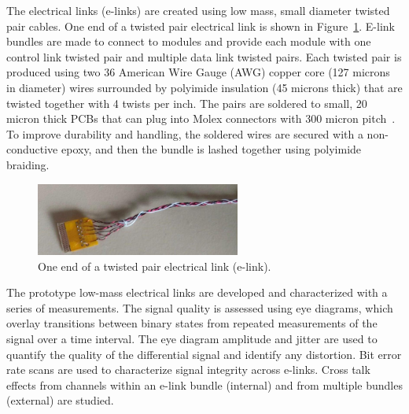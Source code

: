 \documentclass[a4paper,11pt]{article}
\newcommand{\fig}{Figure}
\begin{document}

The electrical links (e-links) are created using low mass, small diameter twisted pair cables.
One end of a twisted pair electrical link is shown in \fig~\ref{fig:elink}.
E-link bundles are made to connect to modules and provide each module with one control link twisted pair and multiple data link twisted pairs.
Each twisted pair is produced using two 36 American Wire Gauge (AWG) copper core (127 microns in diameter) wires surrounded by polyimide insulation (45 microns thick) that are twisted together with 4 twists per inch.
The pairs are soldered to small, 20 micron thick PCBs that can plug into Molex connectors with 300 micron pitch~\cite{ref:molex17,ref:molex33,ref:molex45}.
To improve durability and handling, the soldered wires are secured with a non-conductive epoxy, and then the bundle is lashed together using polyimide braiding.

\begin{figure}[htbp]
\centering
\includegraphics[width=0.6\textwidth,origin=c]{../figures/e-link-1.jpg}
\caption{
\label{fig:elink}
One end of a twisted pair electrical link (e-link).
}
\end{figure}




The prototype low-mass electrical links are developed and characterized with a series of measurements.
The signal quality is assessed using eye diagrams, which overlay transitions between binary states from repeated measurements of the signal over a time interval.
The eye diagram amplitude and jitter are used to quantify the quality of the differential signal and identify any distortion.
Bit error rate scans are used to characterize signal integrity across e-links.
Cross talk effects from channels within an e-link bundle (internal) and from multiple bundles (external) are studied.
\end{document}
